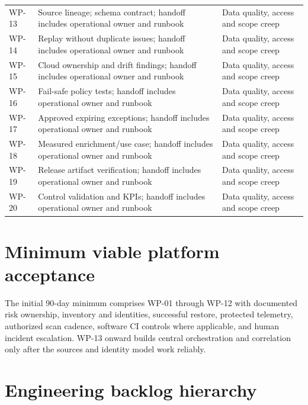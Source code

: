 \documentclass[11pt,oneside]{report}
\begin{document}
\begin{longtable}{P{0.1\textwidth}P{0.60\textwidth}P{0.19\textwidth}}
WP-13 & Source lineage; schema contract; handoff includes operational owner and runbook & Data quality, access and scope creep \\
WP-14 & Replay without duplicate issues; handoff includes operational owner and runbook & Data quality, access and scope creep \\
WP-15 & Cloud ownership and drift findings; handoff includes operational owner and runbook & Data quality, access and scope creep \\
WP-16 & Fail-safe policy tests; handoff includes operational owner and runbook & Data quality, access and scope creep \\
WP-17 & Approved expiring exceptions; handoff includes operational owner and runbook & Data quality, access and scope creep \\
WP-18 & Measured enrichment/use case; handoff includes operational owner and runbook & Data quality, access and scope creep \\
WP-19 & Release artifact verification; handoff includes operational owner and runbook & Data quality, access and scope creep \\
WP-20 & Control validation and KPIs; handoff includes operational owner and runbook & Data quality, access and scope creep \\
\bottomrule\end{longtable}
\section{Minimum viable platform acceptance}
The initial 90-day minimum comprises WP-01 through WP-12 with documented risk ownership, inventory and identities, successful restore, protected telemetry, authorized scan cadence, software CI controls where applicable, and human incident escalation. WP-13 onward builds central orchestration and correlation only after the sources and identity model work reliably.

\section{Engineering backlog hierarchy}
\end{document}
